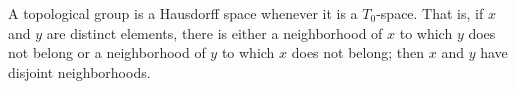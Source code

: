 A topological group is a Hausdorff space whenever it is a $T_0$-space. That is, if $x$ and $y$ are distinct elements, there is either a neighborhood of $x$ to which $y$ does not belong or a neighborhood of $y$ to which $x$ does not belong; then $x$ and $y$ have disjoint neighborhoods.
